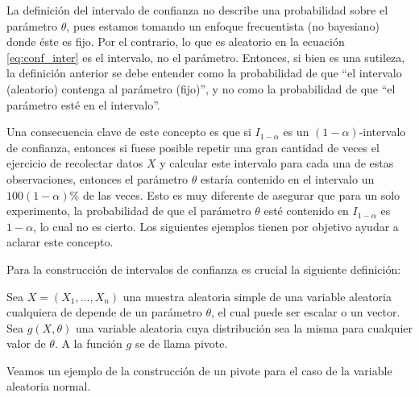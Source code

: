 \begin{remark}
	La definición del intervalo de confianza no describe una probabilidad sobre el parámetro $\theta$, pues estamos tomando un enfoque frecuentista (no bayesiano) donde éste es fijo. Por el contrario, lo que es aleatorio en la ecuación \eqref{eq:conf_inter} es el intervalo, no el parámetro. Entonces, si bien es una sutileza, la definición anterior se debe entender como la probabilidad de que ``el intervalo (aleatorio) contenga al parámetro (fijo)'', y no como la probabilidad de que ``el parámetro esté en el intervalo''. 
\end{remark}
Una consecuencia clave de este concepto es que si $I_{1-\alpha}$ es un $(1-\alpha)$-intervalo de confianza, entonces si fuese posible repetir una gran cantidad de veces el ejercicio de recolectar datos $X$ y calcular este intervalo para cada una de estas observaciones, entonces el parámetro $\theta$ estaría contenido en el intervalo un $100(1-\alpha)\%$ de las veces. Esto es muy diferente de asegurar que para un solo experimento, la probabilidad de que el parámetro $\theta$ esté contenido en $I_{1-\alpha}$ es $1-\alpha$, lo cual no es cierto. Los siguientes ejemplos tienen por objetivo ayudar a aclarar este concepto.

Para la construcción de intervalos de confianza es crucial la siguiente definición:

\begin{definition}[Pivote]

Sea $X=(X_1,...,X_n)$ una muestra aleatoria simple de una variable aleatoria cualquiera de depende de un parámetro $\theta$, el cual puede ser escalar o un vector. Sea $g(X,\theta)$ una variable aleatoria cuya distribución sea la misma para cualquier valor de $\theta$. A la función $g$ se de llama pivote.

\end{definition}

Veamos un ejemplo de la construcción de un pivote para el caso de la variable aleatoria normal.

